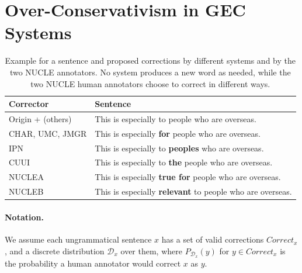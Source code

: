 \documentclass[letterpaper, 11pt]{article}
\begin{document}
\section{Over-Conservativism in GEC Systems}\label{sec:formal_conservatism}
\begin{table}
	\vspace{-0.5cm}
	\centering
	\small
	\singlespacing
	\begin{tabular}{lp{4cm}}
		Corrector & Sentence \\
		\hline 
		Origin + (others) & This is especially to people who are overseas. \\ 
		CHAR, UMC, JMGR & This is especially \textbf{for} people who are overseas. \\ 
		IPN & This is especially to \textbf{peoples} who are overseas. \\ 
		CUUI &  This is especially to \textbf{the} people who are overseas. \\ 
		\hline
		NUCLEA & This is especially \textbf{true for} people who are overseas.\\
		NUCLEB & This is especially \textbf{relevant} to people who are overseas.
	\end{tabular}
	\caption{Example for a sentence and proposed corrections by different systems and by the two NUCLE annotators. No system produces a new word as needed, while the two NUCLE human annotators choose to correct in different ways.}
	\vspace{-0.5cm}
\end{table} 
%
%

\paragraph{Notation.}
We assume each ungrammatical sentence $x$ has a set of valid corrections $Correct_x$,
and a discrete distribution $\mathcal{D}_x$ over them, where $P_{\mathcal{D}_x}(y)$
for $y \in Correct_x$ is the probability a human annotator would correct $x$ as $y$.
\end{document}
